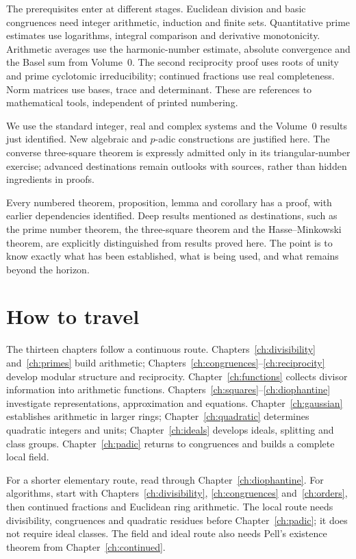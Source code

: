 The prerequisites enter at different stages. Euclidean division and basic
congruences need integer arithmetic, induction and finite sets.
Quantitative prime estimates use logarithms, integral comparison and
derivative monotonicity. Arithmetic averages use the harmonic-number estimate,
absolute convergence and the Basel sum from Volume~0.
The second reciprocity proof uses roots of unity and prime cyclotomic
irreducibility; continued fractions use real completeness.
Norm matrices use bases, trace and determinant.
These are references to mathematical tools, independent of printed numbering.

We use the standard integer, real and complex systems and the Volume~0
results just identified. New algebraic and $p$-adic constructions are
justified here. The converse three-square theorem is expressly admitted
only in its triangular-number exercise; advanced destinations remain
outlooks with sources, rather than hidden ingredients in proofs.

Every numbered theorem, proposition, lemma and corollary has a proof, with earlier dependencies identified.
Deep results mentioned as destinations, such as the prime number theorem, the three-square theorem and the
Hasse--Minkowski theorem, are explicitly distinguished from results proved here. The point is to know exactly
what has been established, what is being used, and what remains beyond the horizon.

\section*{How to travel}
The thirteen chapters follow a continuous route. Chapters~\ref{ch:divisibility}
and~\ref{ch:primes} build arithmetic; Chapters~\ref{ch:congruences}--\ref{ch:reciprocity}
develop modular structure and reciprocity. Chapter~\ref{ch:functions} collects
divisor information into arithmetic functions.
Chapters~\ref{ch:squares}--\ref{ch:diophantine} investigate representations,
approximation and equations.
Chapter~\ref{ch:gaussian} establishes arithmetic in larger rings;
Chapter~\ref{ch:quadratic} determines quadratic integers and units;
Chapter~\ref{ch:ideals} develops ideals, splitting and class groups.
Chapter~\ref{ch:padic} returns to congruences and builds a complete local field.

For a shorter elementary route, read through Chapter~\ref{ch:diophantine}.
For algorithms, start with Chapters~\ref{ch:divisibility},
\ref{ch:congruences} and~\ref{ch:orders}, then continued fractions and
Euclidean ring arithmetic. The local route needs divisibility, congruences
and quadratic residues before Chapter~\ref{ch:padic}; it does not require
ideal classes. The field and ideal route also needs Pell's existence
theorem from Chapter~\ref{ch:continued}.

